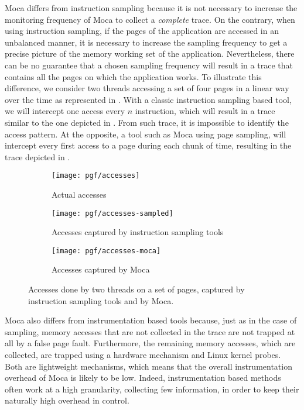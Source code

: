 \gls{Moca} differs from instruction sampling because it is not necessary to increase the monitoring frequency of \gls{Moca} to collect a \emph{complete} trace.
On the contrary, when using instruction sampling, if the pages of the application are accessed in an unbalanced manner, it is necessary to increase the sampling frequency to get a precise picture of the memory working set of the application.
Nevertheless, there can be no guarantee that a chosen sampling frequency will result in a trace that contains all the pages on which the application works.
To illustrate this difference, we consider two threads accessing a set of four pages in a linear way over the time as represented in .
With a classic instruction sampling based tool, we will intercept one access every $n$ instruction, which will result in a trace similar to the one depicted in .
From such trace, it is impossible to identify the access pattern.
At the opposite, a tool such as \gls{Moca} using page sampling, will intercept every first access to a page during each chunk of time, resulting in the trace depicted in .

\begin{figure}[htb]
    \centering
    \begin{subfigure}{.6\linewidth}
        \centering
        \texttt{[image: pgf/accesses]}
        \label{fig:acc-real}
        \caption{Actual accesses}
    \end{subfigure}
    \begin{subfigure}{.49\linewidth}
        \centering
        \texttt{[image: pgf/accesses-sampled]}
        \caption{Accesses captured by instruction sampling tools}
        \label{fig:acc-sampling}
    \end{subfigure}
    \begin{subfigure}{.49\linewidth}
        \centering
        \texttt{[image: pgf/accesses-moca]}
        \caption{Accesses captured by Moca}
        \label{fig:acc-moca}
    \end{subfigure}
    \caption{Accesses done by two threads on a set of pages, captured by instruction sampling tools and by Moca.}
    \label{fig:acc-sampling-moca}
\end{figure}

\gls{Moca} also differs from instrumentation based tools because, just as in the case of sampling, memory accesses that are not collected in the trace are not trapped at all by a false page fault.
Furthermore, the remaining memory accesses, which are collected, are trapped using a hardware mechanism and Linux kernel probes.
Both are lightweight mechanisms, which means that the overall instrumentation overhead of \gls{Moca} is likely to be low.
Indeed, instrumentation based methods often work at a high granularity, collecting few information, in order to keep their naturally high overhead in control.

